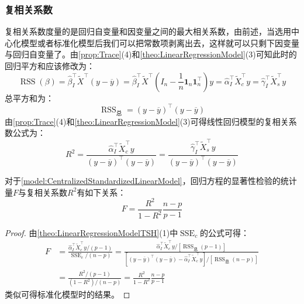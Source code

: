 \subsubsection{复相关系数}
\begin{note}
	复相关系数度量的是回归自变量和因变量之间的最大相关系数，由前述，当选用中心化模型或者标准化模型后我们可以把常数项剥离出去，这样就可以只剩下因变量与回归自变量了。由\cref{prop:Trace}(4)和\cref{theo:LinearRegressionModel}(3)可知此时的回归平方和应该修改为：
	\begin{equation*}
		\operatorname{RSS}(\beta)=\hat{\beta}_I^{\top}\tilde{X}^{\top}(y-\overline{y})=\hat{\beta}_I^{\top}\tilde{X}^{\top}\left(I_n-\frac{1}{n}\mathbf{1}_n\mathbf{1}_n^{\top}\right)y=\hat{\alpha}_I^{\top}\tilde{X}_c^{\top}y=\hat{\gamma}_I^{\top}\tilde{X}_s^{\top}y
	\end{equation*}
	总平方和为：
	\begin{equation*}
		\operatorname{RSS}_{\text{总}}=(y-\overline{y})^{\top}(y-\overline{y})
	\end{equation*}
	由\cref{prop:Trace}(4)和\cref{theo:LinearRegressionModel}(3)可得线性回归模型的复相关系数公式为：
	\begin{equation*}
		R^2=\frac{\hat{\alpha}_I^{\top}\tilde{X}_c^{\top}y}{(y-\overline{y})^{\top}(y-\overline{y})}=\frac{\hat{\gamma}_I^{\top}\tilde{X}_s^{\top}y}{(y-\overline{y})^{\top}(y-\overline{y})}
	\end{equation*}
\end{note}
\begin{theorem}\label{theo:LinearRegressionModelFR2}
	对于\cref{model:CentralizedStandardizedLinearModel}，回归方程的显著性检验的统计量$F$与复相关系数$R^2$有如下关系：
	\begin{equation*}
		F=\frac{R^2}{1-R^2}\frac{n-p}{p-1}
	\end{equation*}
\end{theorem}
\begin{proof}
	由\cref{theo:LinearRegressionModelTSH}(1)中$\operatorname{SSE}_c$的公式可得：
	\begin{align*}
		F&=\frac{\hat{\alpha}_I^{\top}\tilde{X}_c^{\top}y/(p-1)}{\operatorname{SSE}_c/(n-p)}=\frac{\hat{\alpha}_I^{\top}\tilde{X}_c^{\top}y/[\operatorname{RSS}_{\text{总}}(p-1)]}{[(y-\overline{y})^{\top}(y-\overline{y})-\hat{\alpha}_I^{\top}\tilde{X}_c^{\top}y]/[\operatorname{RSS}_{\text{总}}(n-p)]} \\
		&=\frac{R^2/(p-1)}{(1-R^2)/(n-p)}=\frac{R^2}{1-R^2}\frac{n-p}{p-1}
	\end{align*}
	类似可得标准化模型时的结果。
\end{proof}

